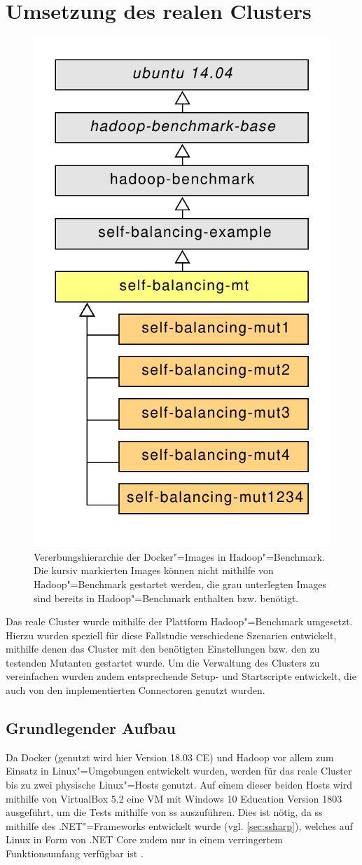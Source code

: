\section{Umsetzung des realen Clusters}
\label{sec:realCluster}

\begin{figure}
    \includegraphics[width=0.4\columnwidth]
    {./resources/hadoopBenchDockerInherits.pdf}
    \caption[Vererbungshierarchie der Docker"=Images in Hadoop"=Benchmark]
    {Vererbungshierarchie der Docker"=Images in Hadoop"=Benchmark.
    Die kursiv markierten Images können nicht mithilfe von Hadoop"=Benchmark gestartet werden, die grau unterlegten Images sind bereits in Hadoop"=Benchmark enthalten bzw. benötigt.}
    \label{fig:hadoopBenchDockerInherits}
\end{figure}

Das reale Cluster wurde mithilfe der Plattform Hadoop"=Benchmark umgesetzt.
Hierzu wurden speziell für diese Fallstudie verschiedene Szenarien entwickelt, mithilfe denen das Cluster mit den benötigten Einstellungen bzw. den zu testenden Mutanten gestartet wurde.
Um die Verwaltung des Clusters zu vereinfachen wurden zudem entsprechende Setup- und Startscripte entwickelt, die auch von den implementierten Connectoren genutzt wurden.

\subsection{Grundlegender Aufbau}
\label{subsec:clusterBasics}

Da Docker (genutzt wird hier Version 18.03 CE) und Hadoop vor allem zum Einsatz in Linux"=Umgebungen entwickelt wurden, werden für das reale Cluster bis zu zwei physische Linux"=Hosts genutzt.
Auf einem dieser beiden Hosts wird mithilfe von VirtualBox 5.2 eine VM mit Windows 10 Education Version 1803 ausgeführt, um die \glspl{Test} mithilfe von \gls{ss} auszuführen.
Dies ist nötig, da \gls{ss} mithilfe des .NET"=Frameworks entwickelt wurde (vgl. \cref{sec:ssharp}), welches auf Linux in Form von .NET Core zudem nur in einem verringertem Funktionsumfang verfügbar ist \cite{Schwichtenberg2017}.

